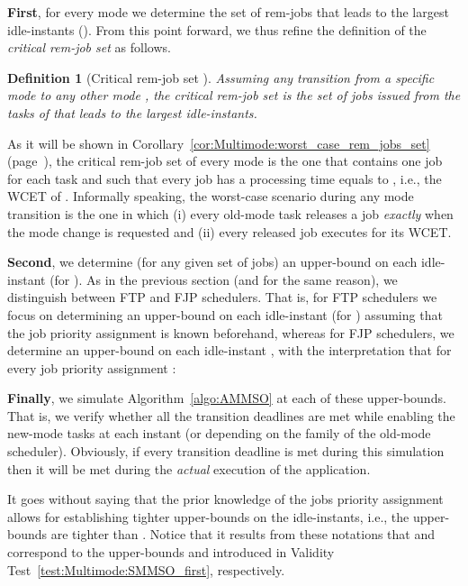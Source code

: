 \documentclass{article}
\newtheorem{Definition}{Definition}
\newtheorem{validity test}{Validity Test}
\begin{document}
{\bf First}, for every mode  we determine the set  of rem-jobs that leads to the largest idle-instants  (). From this point forward, we thus refine the definition of the \emph{critical rem-job set} as follows. 

\begin{Definition}[Critical rem-job set ]
\label{def:Multimode:worst_case_configuration_2}
Assuming any transition from a specific mode  to any other mode , the critical rem-job set  is the set of jobs issued from the tasks of  that leads to the largest idle-instants. 
\end{Definition}

As it will be shown in Corollary~\ref{cor:Multimode:worst_case_rem_jobs_set} (page~\pageref{cor:Multimode:worst_case_rem_jobs_set}), the critical rem-job set  of every mode  is the one that contains one job  for each task  and such that every job  has a processing time equals to , i.e., the WCET of . Informally speaking, the worst-case scenario during any mode transition is the one in which (i) every old-mode task releases a job \emph{exactly} when the mode change is requested and (ii) every released job executes for its WCET. 

{\bf Second}, we determine (for any given set  of jobs) an upper-bound on each idle-instant  (for ). As in the previous section (and for the same reason), we distinguish between FTP and FJP schedulers. That is, for FTP schedulers we focus on determining an upper-bound  on each  idle-instant  (for ) assuming that the job priority assignment  is known beforehand, whereas for FJP schedulers, we determine an upper-bound  on each  idle-instant , with the interpretation that for every job priority assignment : 


{\bf Finally}, we simulate Algorithm~\ref{algo:AMMSO} at each of these upper-bounds. That is, we verify whether all the transition deadlines are met while enabling the new-mode tasks at each instant   (or  depending on the family of the old-mode scheduler). Obviously, if every transition deadline is met during this simulation then it will be met during the \emph{actual} execution of the application. 

It goes without saying that the prior knowledge of the jobs priority assignment allows for establishing tighter upper-bounds on the idle-instants, i.e., the upper-bounds  are tighter than . Notice that it results from these notations that  and  correspond to the upper-bounds  and  introduced in Validity Test~\ref{test:Multimode:SMMSO_first}, respectively. 
\end{document}
